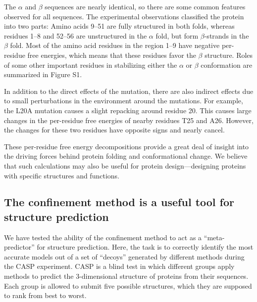 \documentclass[12pt]{article}
\begin{document}
The $\alpha$ and $\beta$ sequences are nearly identical, so there are some common features observed for all sequences.
The experimental observations classified the protein into two parts: Amino acids 9--51 are fully structured in both
folds, whereas residues 1--8 and 52--56 are unstructured in the $\alpha$ fold, but form $\beta$-strands in the $\beta$
fold. Most of the amino acid residues in the region 1--9 have negative per-residue free energies, which means that these
residues favor the $\beta$ structure. Roles of some other important residues in stabilizing either the $\alpha$ or
$\beta$ conformation are summarized in Figure S1.

In addition to the direct effects of the mutation, there are also indirect effects due to small perturbations in the
environment around the mutations. For example, the L20A mutation causes a slight repacking around residue 20. This
causes large changes in the per-residue free energies of nearby residues T25 and A26. However, the changes for these two
residues have opposite signs and nearly cancel.

These per-residue free energy decompositions provide a great deal of insight into the driving forces behind protein
folding and conformational change. We believe that such calculations may also be useful for protein design---designing
proteins with specific structures and functions.

\subsection*{The confinement method is a useful tool for structure prediction}

We have tested the ability of the confinement method to act as a ``meta-predictor'' for structure prediction. Here, the
task is to correctly identify the most accurate models out of a set of ``decoys'' generated by different methods during
the CASP experiment. CASP is a blind test in which different groups apply methods to predict the 3-dimensional structure
of proteins from their sequences. Each group is allowed to submit five possible structures, which they are supposed to
rank from best to worst.
\end{document}
